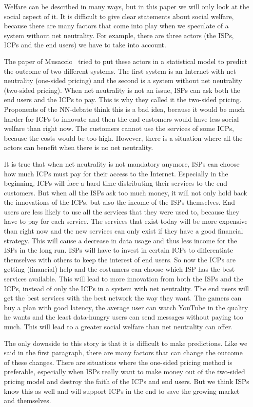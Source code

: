 Welfare can be described in many ways, but in this paper we will only look at the social aspect of it. It is difficult to give clear statements about social welfare, because there are many factors that come into play when we speculate of a system without net neutrality. For example, there are three actors (the \acp{ISP}, \acp{ICP} and the end users) we have to take into account.

The paper of Musaccio~\cite{musacchio2009} tried to put these actors in a statistical model to predict the outcome of two different systems. The first system is an Internet with net neutrality (one-sided pricing) and the second is a system without net neutrality (two-sided pricing). When net neutrality is not an issue, \acp{ISP} can ask both the end users and the \acp{ICP} to pay. This is why they called it the two-sided pricing. Proponents of the NN-debate think this is a bad idea, because it would be much harder for \acp{ICP} to innovate and then the end customers would have less social welfare than right now. The customers cannot use the services of some \acp{ICP}, because the costs would be too high. However, there is a situation where all the actors can benefit when there is no net neutrality.

It is true that when net neutrality is not mandatory anymore, \acp{ISP} can choose how much \acp{ICP} must pay for their access to the Internet. Especially in the beginning, \acp{ICP} will face a hard time distributing their services to the end customers. But when all the \acp{ISP} ask too much money, it will not only hold back the innovations of the \acp{ICP}, but also the income of the \acp{ISP} themselves. End users are less likely to use all the services that they were used to, because they have to pay for each service. The services that exist today will be more expensive than right now and the new services can only exist if they have a good financial strategy. This will cause a decrease in data usage and thus less income for the \acp{ISP} in the long run. \acp{ISP} will have to invest in certain \acp{ICP} to differentiate themselves with others to keep the interest of end users. So now the \acp{ICP} are getting (financial) help and the costumers can choose which \ac{ISP} has the best services available. This will lead to more innovation from both the \acp{ISP} and the \acp{ICP}, instead of only the \acp{ICP} in a system with net neutrality. The end users will get the best services with the best network the way they want. The gamers can buy a plan with good latency, the average user can watch YouTube in the quality he wants and the least data-hungry users can send messages without paying too much. This will lead to a greater social welfare than net neutrality can offer.

The only downside to this story is that it is difficult to make predictions. Like we said in the first paragraph, there are many factors that can change the outcome of these changes. There are situations where the one-sided pricing method is preferable, especially when \acp{ISP} really want to make money out of the two-sided pricing model and destroy the faith of the \acp{ICP} and end users. But we think \acp{ISP} know this as well and will support \acp{ICP} in the end to save the growing market and themselves.